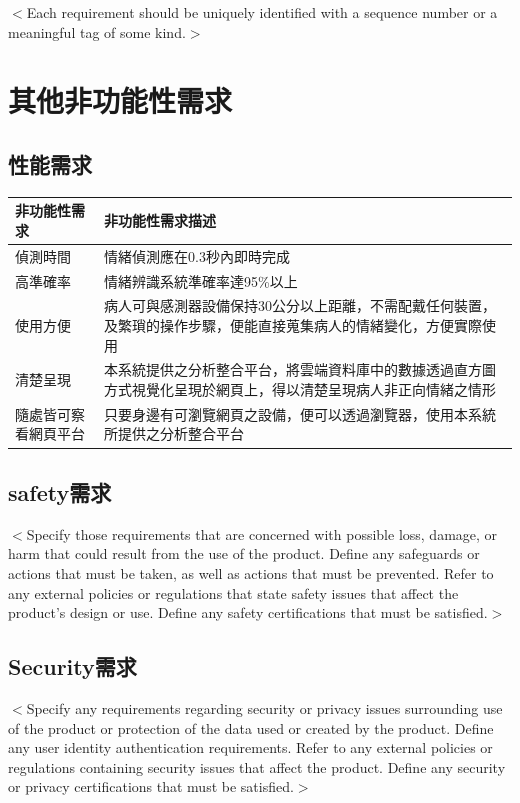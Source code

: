 \documentclass[12pt]{scrreprt}
\begin{document}
$<$Each requirement should be uniquely identified with a sequence number or a 
meaningful tag of some kind.$>$


\chapter{其他非功能性需求}

\section{性能需求}

\begin{center}  
\begin{tabular}{|l| p{10cm}|}  
\hline  
非功能性需求 & 非功能性需求描述   \\ \hline  
偵測時間 & 情緒偵測應在0.3秒內即時完成    \\ \hline  
高準確率 & 情緒辨識系統準確率達95\%以上 \\ \hline
使用方便 &病人可與感測器設備保持30公分以上距離，不需配戴任何裝置，及繁瑣的操作步驟，便能直接蒐集病人的情緒變化，方便實際使用 \\ \hline
清楚呈現 & 本系統提供之分析整合平台，將雲端資料庫中的數據透過直方圖方式視覺化呈現於網頁上，得以清楚呈現病人非正向情緒之情形 \\ \hline
隨處皆可察看網頁平台 & 只要身邊有可瀏覽網頁之設備，便可以透過瀏覽器，使用本系統所提供之分析整合平台 \\ \hline

\end{tabular}  
\end{center}  

\section{safety需求}
$<$Specify those requirements that are concerned with possible loss, damage, or 
harm that could result from the use of the product. Define any safeguards or 
actions that must be taken, as well as actions that must be prevented. Refer to 
any external policies or regulations that state safety issues that affect the 
product’s design or use. Define any safety certifications that must be 
satisfied.$>$

\section{Security需求}
$<$Specify any requirements regarding security or privacy issues surrounding use 
of the product or protection of the data used or created by the product. Define 
any user identity authentication requirements. Refer to any external policies or 
regulations containing security issues that affect the product. Define any 
security or privacy certifications that must be satisfied.$>$
\end{document}

